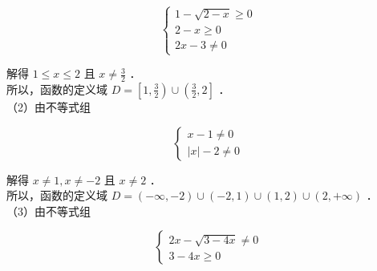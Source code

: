 \documentclass[10pt]{article}
\begin{document}
\[
\left\{\begin{array}{l}
1-\sqrt{2-x} \geqslant 0 \\
2-x \geqslant 0 \\
2 x-3 \neq 0
\end{array}\right.
\]

解得 \(1 \leqslant x \leqslant 2\) 且 \(x \neq \frac{3}{2}\) ．\\
所以，函数的定义域 \(D=\left[1, \frac{3}{2}\right) \cup\left(\frac{3}{2}, 2\right]\) ．\\
（2）由不等式组

\[
\left\{\begin{array}{l}
x-1 \neq 0 \\
|x|-2 \neq 0
\end{array}\right.
\]

解得 \(x \neq 1, x \neq-2\) 且 \(x \neq 2\) ．\\
所以，函数的定义域 \(D=(-\infty,-2) \cup(-2,1) \cup(1,2) \cup(2,+\infty)\) ．\\
（3）由不等式组

\[
\left\{\begin{array}{l}
2 x-\sqrt{3-4 x} \neq 0 \\
3-4 x \geqslant 0
\end{array}\right.
\]
\end{document}
